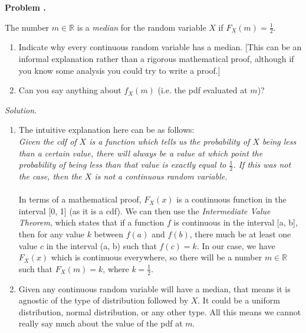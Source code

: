 \documentclass[11pt]{article}
\newcounter{problem}
\newenvironment{problem}[1][]{%
  \refstepcounter{problem}%
  \bigskip\noindent\textbf{Problem \theproblem. #1}\par\smallskip\noindent
}{\bigskip}
\newenvironment{solution}{%
  \noindent\textit{Solution.}\quad
}{\par\bigskip}
\begin{document}
\begin{problem}
The number $m \in \mathbb{R}$ is a \textit{median} for the random variable $X$ if
$F_X(m) = \frac{1}{2}$.
\begin{enumerate}
      \item Indicate why every continuous random variable has a median. [This can be
            an informal explanation rather than a rigorous mathematical proof, 
            although if you know some analysis you could try to write a proof.]
      \item Can you say anything about $f_X(m)$ (i.e. the pdf evaluated at $m$)?
\end{enumerate}
\end{problem}

\begin{solution}
\begin{enumerate}
      \item The intuitive explanation here can be as follows: \\
            \textit{
            Given the cdf of $X$ is a function which tells us the probability 
            of $X$ being less than a certain value, there will always be a value
            at which point the probability of being less than that value is exactly
            equal to $\frac{1}{2}$. If this was not the case, then the $X$ is not 
            a continuous random variable.
            } \\
            \\
            In terms of a mathematical proof, $F_X(x)$ is a continuous function 
            in the interval [0, 1] (as it is a cdf). We can then use the \textit{
            Intermediate Value Theorem}, which states that if a function $f$ is 
            continuous in the interval [a, b], then for any value $k$ between 
            $f(a)$ and $f(b)$, there much be at least one value $c$ in the 
            interval (a, b) such that $f(c) = k$. In our case, we have $F_X(x)$ which
            is continuous everywhere, so there will be a number $m \in \mathbb{R}$ 
            such that $F_X(m) = k$, where $k = \frac{1}{2}$.
      \item Given any continuous random variable will have a median, that means it
            is agnostic of the type of distribution followed by $X$. It could be a 
            uniform distribution, normal distribution, or any other type. All this 
            means we cannot really say much about the value of the pdf at $m$.
\end{enumerate}
\end{solution}
\end{document}
